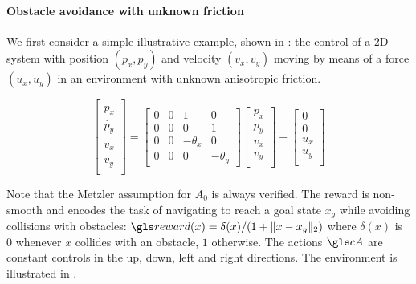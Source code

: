 \paragraph{Obstacle avoidance with unknown friction}
We first consider a simple illustrative example, shown in : the control of a 2D system with position $(p_x,p_y)$ and velocity $(v_x, v_y)$ moving by means of a force $(u_x, u_y)$ in an environment with unknown anisotropic friction.

\begin{equation*}
\begin{bmatrix}
\dot{p_x}\\
\dot{p_y}\\
\dot{v_x}\\
\dot{v_y}\\
\end{bmatrix} = 
\begin{bmatrix}
0 & 0 & 1 & 0 \\
0 & 0 & 0 & 1 \\
0 & 0 & -\theta_x & 0 \\
0 & 0 & 0 & -\theta_y
\end{bmatrix}
\begin{bmatrix}
{p_x}\\
{p_y}\\
{v_x}\\
{v_y}\\
\end{bmatrix}
+
\begin{bmatrix}
0\\
0\\
{u_x}\\
{u_y}\\
\end{bmatrix}
\end{equation*}


Note that the Metzler assumption for $A_0$ is always verified. The reward is non-smooth and encodes the task of navigating to reach a goal state $x_g$ while avoiding collisions with obstacles: $\R(x) = \delta(x)/(1 + \|x - x_g\|_2)$  where $\delta(x)$ is $0$ whenever $x$ collides with an obstacle, $1$ otherwise. The actions $\cA$ are constant controls in the up, down, left and right directions. The environment is illustrated in .

